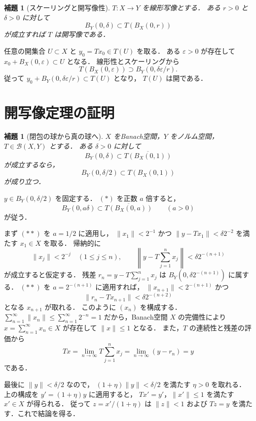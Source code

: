 \documentclass[a5paper,10pt,onecolumn]{jsarticle}
\makeatletter
\theoremstyle{mathnotetheorem}
\newtheorem{lemma}[theorem]{補題}
\renewcommand{\proofname}{証明}
\renewenvironment{proof}[1][\proofname]{%
  \par\pushQED{\qed}\normalfont\topsep4\p@\@plus2\p@\relax
  \trivlist\item[\hskip\labelsep\bfseries #1]\ignorespaces
}{\popQED\endtrivlist\@endpefalse}
\makeatother
\begin{document}
\begin{lemma}[スケーリングと開写像性]\label{lem:openball}
$T:X\to Y$ を線形写像とする．
ある $r>0$ と $\delta>0$ に対して
\[
 B_Y(0,\delta)\subset T(B_X(0,r))
\]
が成立すれば $T$ は開写像である．
\end{lemma}
\begin{proof}
任意の開集合 $U\subset X$ と $y_0=Tx_0\in T(U)$ を取る．
ある $\varepsilon>0$ が存在して
$x_0+B_X(0,\varepsilon)\subset U$ となる．
線形性とスケーリングから
\[
 T(B_X(0,\varepsilon))
 \supset B_Y(0,\delta\varepsilon/r).
\]
従って
$y_0+B_Y(0,\delta\varepsilon/r)\subset T(U)$ となり，
$T(U)$ は開である．
\end{proof}

\section{開写像定理の証明}

\begin{lemma}[閉包の球から真の球へ]\label{lem:closureball}
$X$ をBanach空間，$Y$ をノルム空間，
$T\in\mathcal B(X,Y)$ とする．
ある $\delta>0$ に対して
\[
 B_Y(0,\delta)
 \subset\overline{T(B_X(0,1))}
 \tag{$*$}
\]
が成立するなら，
\[
 B_Y(0,\delta/2)\subset T(B_X(0,1))
\]
が成り立つ．
\end{lemma}
\begin{proof}
$y\in B_Y(0,\delta/2)$ を固定する．
$(*)$ を正数 $a$ 倍すると，
\[
 B_Y(0,a\delta)\subset
 \overline{T(B_X(0,a))}\qquad(a>0)
 \tag{$**$}
\]
が従う．

まず $(**)$ を $a=1/2$ に適用し，
$\|x_1\|<2^{-1}$ かつ
$\|y-Tx_1\|<\delta 2^{-2}$ を満たす
$x_1\in X$ を取る．
帰納的に
\[
 \|x_j\|<2^{-j}\quad(1\le j\le n),
 \qquad
 \left\|y-T\sum_{j=1}^{n}x_j\right\|
 <\delta 2^{-(n+1)}
\]
が成立すると仮定する．
残差 $r_n=y-T\sum_{j=1}^nx_j$ は
$B_Y(0,\delta2^{-(n+1)})$ に属する．
$(**)$ を $a=2^{-(n+1)}$ に適用すれば，
$\|x_{n+1}\|<2^{-(n+1)}$ かつ
\[
 \|r_n-Tx_{n+1}\|<\delta2^{-(n+2)}
\]
となる $x_{n+1}$ が取れる．
このように $(x_n)$ を構成する．
$\sum_{n=1}^\infty\|x_n\|\le\sum_{n=1}^\infty2^{-n}=1$
だから，Banach空間 $X$ の完備性により
$x=\sum_{n=1}^\infty x_n\in X$ が存在して $\|x\|\le1$ となる．
また，$T$ の連続性と残差の評価から
\[
 Tx=\lim_{n\to\infty}T\sum_{j=1}^nx_j
 =\lim_{n\to\infty}(y-r_n)=y
\]
である．

最後に $\|y\|<\delta/2$ なので，
$(1+\eta)\|y\|<\delta/2$ を満たす $\eta>0$ を取れる．
上の構成を $y'=(1+\eta)y$ に適用すると，
$Tx'=y'$，$\|x'\|\le1$ を満たす $x'\in X$ が得られる．
従って $z=x'/(1+\eta)$ は $\|z\|<1$ および
$Tz=y$ を満たす．これで結論を得る．
\end{proof}
\end{document}
